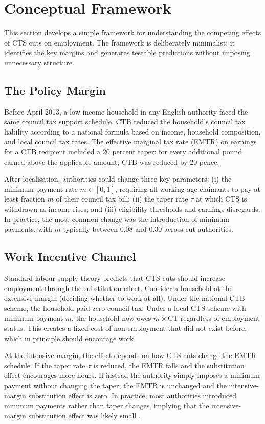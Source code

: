 \documentclass[12pt]{article}
\begin{document}
\section{Conceptual Framework}

This section develops a simple framework for understanding the competing effects of CTS cuts on employment. The framework is deliberately minimalist: it identifies the key margins and generates testable predictions without imposing unnecessary structure.

\subsection{The Policy Margin}

Before April 2013, a low-income household in any English authority faced the same council tax support schedule. CTB reduced the household's council tax liability according to a national formula based on income, household composition, and local council tax rates. The effective marginal tax rate (EMTR) on earnings for a CTB recipient included a 20 percent taper: for every additional pound earned above the applicable amount, CTB was reduced by 20 pence.

After localisation, authorities could change three key parameters: (i) the minimum payment rate $m \in [0, 1]$, requiring all working-age claimants to pay at least fraction $m$ of their council tax bill; (ii) the taper rate $\tau$ at which CTS is withdrawn as income rises; and (iii) eligibility thresholds and earnings disregards. In practice, the most common change was the introduction of minimum payments, with $m$ typically between 0.08 and 0.30 across cut authorities.

\subsection{Work Incentive Channel}

Standard labour supply theory predicts that CTS cuts should increase employment through the substitution effect. Consider a household at the extensive margin (deciding whether to work at all). Under the national CTB scheme, the household paid zero council tax. Under a local CTS scheme with minimum payment $m$, the household now owes $m \times \text{CT}$ regardless of employment status. This creates a fixed cost of non-employment that did not exist before, which in principle should encourage work.

At the intensive margin, the effect depends on how CTS cuts change the EMTR schedule. If the taper rate $\tau$ is reduced, the EMTR falls and the substitution effect encourages more hours. If instead the authority simply imposes a minimum payment without changing the taper, the EMTR is unchanged and the intensive-margin substitution effect is zero. In practice, most authorities introduced minimum payments rather than taper changes, implying that the intensive-margin substitution effect was likely small \citep{adam2019taxing}.
\end{document}
